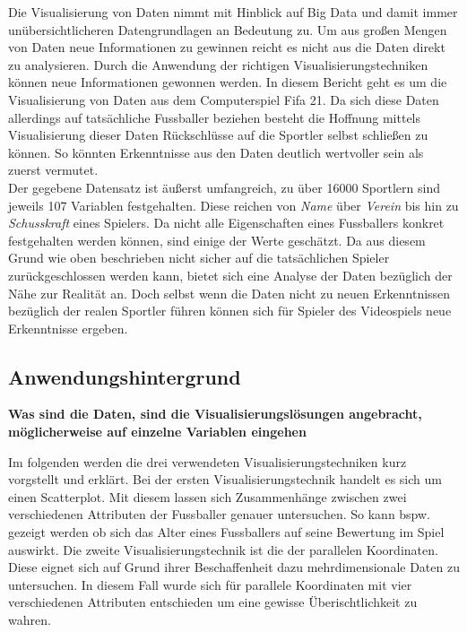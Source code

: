 \documentclass[usegeometry=true]{scrartcl}
\begin{document}
Die Visualisierung von Daten nimmt mit Hinblick auf Big Data und damit immer unübersichtlicheren Datengrundlagen an Bedeutung zu. Um aus großen Mengen von Daten neue Informationen zu gewinnen reicht es nicht aus die Daten direkt zu analysieren. Durch die Anwendung der richtigen Visualisierungstechniken können neue Informationen gewonnen werden. In diesem Bericht geht es um die Visualisierung von Daten aus dem Computerspiel Fifa 21. Da sich diese Daten allerdings auf tatsächliche Fussballer beziehen besteht die Hoffnung mittels Visualisierung dieser Daten Rückschlüsse auf die Sportler selbst schließen zu können.
So könnten Erkenntnisse aus den Daten deutlich wertvoller sein als zuerst vermutet.\\
Der gegebene Datensatz ist äußerst umfangreich, zu über 16000 Sportlern sind jeweils 107 Variablen festgehalten. Diese reichen von \textit{Name} über \textit{Verein} bis hin zu \textit{Schusskraft} eines Spielers. Da nicht alle Eigenschaften eines Fussballers konkret festgehalten werden können, sind einige der Werte geschätzt. Da aus diesem Grund wie oben beschrieben nicht sicher auf die tatsächlichen Spieler zurückgeschlossen werden kann, bietet sich eine Analyse der Daten bezüglich der Nähe zur Realität an. Doch selbst wenn die Daten nicht zu neuen Erkenntnissen bezüglich der realen Sportler führen können sich für Spieler des Videospiels neue Erkenntnisse ergeben. 


\subsection{Anwendungshintergrund}
\textbf{Was sind die Daten, sind die Visualisierungslösungen angebracht, möglicherweise auf einzelne Variablen eingehen}\cite{Munzner2008}

Im folgenden werden die drei verwendeten Visualisierungstechniken kurz vorgstellt und erklärt.
Bei der ersten Visualisierungstechnik handelt es sich um einen Scatterplot. Mit diesem lassen sich Zusammenhänge zwischen zwei verschiedenen Attributen der Fussballer genauer untersuchen. So kann bspw. gezeigt werden ob sich das Alter eines Fussballers auf seine Bewertung im Spiel auswirkt.
Die zweite Visualisierungstechnik ist die der parallelen Koordinaten. Diese eignet sich auf Grund ihrer Beschaffenheit dazu mehrdimensionale Daten zu untersuchen. In diesem Fall wurde sich für parallele Koordinaten mit vier verschiedenen Attributen entschieden um eine gewisse Überischtlichkeit zu wahren.
\end{document}
